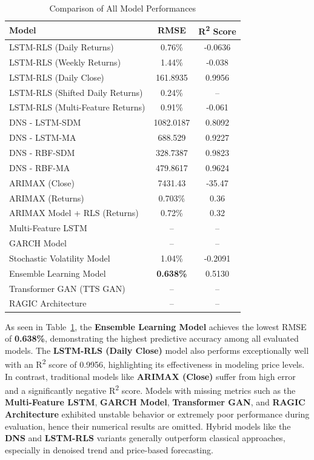 \begin{table}[h!]
    \centering
    \caption{Comparison of All Model Performances}
    \label{tab:all_model_comparison}
    \begin{tabular}{|l|c|c|}
    \hline
    \textbf{Model} & \textbf{RMSE} & \textbf{R\textsuperscript{2} Score} \\ \hline
    
    LSTM-RLS (Daily Returns) & 0.76\% & -0.0636 \\ \hline
    LSTM-RLS (Weekly Returns) & 1.44\% & -0.038 \\ \hline
    LSTM-RLS (Daily Close) & 161.8935 & 0.9956 \\ \hline
    LSTM-RLS (Shifted Daily Returns) & 0.24\% & -- \\ \hline
    LSTM-RLS (Multi-Feature Returns) & 0.91\% & -0.061 \\ \hline
    
    DNS - LSTM-SDM & 1082.0187 & 0.8092 \\ \hline
    DNS - LSTM-MA & 688.529 & 0.9227 \\ \hline
    DNS - RBF-SDM & 328.7387 & 0.9823 \\ \hline
    DNS - RBF-MA & 479.8617 & 0.9624 \\ \hline
    
    ARIMAX (Close) & 7431.43 & -35.47 \\ \hline
    ARIMAX (Returns) & 0.703\% & 0.36 \\ \hline
    ARIMAX Model + RLS (Returns) & 0.72\% & 0.32 \\ \hline
    
    Multi-Feature LSTM & -- & -- \\ \hline
    GARCH Model & -- & -- \\ \hline
    Stochastic Volatility Model & 1.04\% & -0.2091 \\ \hline
    Ensemble Learning Model & \textbf{0.638\%} & 0.5130 \\ \hline
    Transformer GAN (TTS GAN) & -- & -- \\ \hline
    RAGIC Architecture & -- & -- \\ \hline
    
    \end{tabular}
\end{table}

\noindent As seen in Table~\ref{tab:all_model_comparison}, the \textbf{Ensemble Learning Model} achieves the lowest RMSE of \textbf{0.638\%}, demonstrating the highest predictive accuracy among all evaluated models. The \textbf{LSTM-RLS (Daily Close)} model also performs exceptionally well with an R\textsuperscript{2} score of 0.9956, highlighting its effectiveness in modeling price levels. In contrast, traditional models like \textbf{ARIMAX (Close)} suffer from high error and a significantly negative R\textsuperscript{2} score. Models with missing metrics such as the \textbf{Multi-Feature LSTM}, \textbf{GARCH Model}, \textbf{Transformer GAN}, and \textbf{RAGIC Architecture} exhibited unstable behavior or extremely poor performance during evaluation, hence their numerical results are omitted. Hybrid models like the \textbf{DNS} and \textbf{LSTM-RLS} variants generally outperform classical approaches, especially in denoised trend and price-based forecasting.
